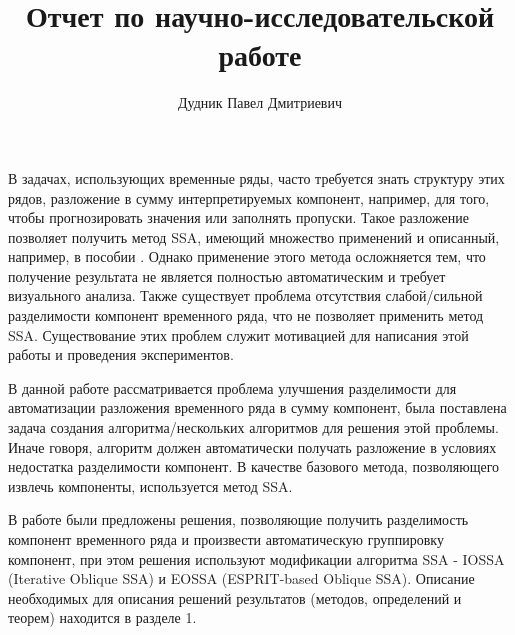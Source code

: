 \documentclass[specialist,
               substylefile = spbu_report.rtx,
               subf,href,colorlinks=true, 12pt]{disser}
\theoremstyle{definition}
\begin{document}
%
%

\title{Отчет по научно-исследовательской работе}


\author{Дудник Павел Дмитриевич}
    

\date{\number\year}

\maketitle

\tableofcontents

\intro
В задачах, использующих временные ряды, часто требуется знать структуру этих рядов, разложение в сумму интерпретируемых компонент, например, для того, чтобы прогнозировать значения или заполнять пропуски. Такое разложение позволяет получить метод SSA, имеющий множество применений и описанный, например, в пособии \cite{Golyandina04}. Однако применение этого метода осложняется тем, что получение результата не является полностью автоматическим и требует визуального анализа. Также существует проблема отсутствия слабой/сильной разделимости компонент временного ряда, что не позволяет применить метод SSA. Существование этих проблем служит мотивацией для написания этой работы и проведения экспериментов.

В данной работе рассматривается проблема улучшения разделимости для автоматизации разложения временного ряда в сумму компонент, была поставлена задача создания алгоритма/нескольких алгоритмов для решения этой проблемы. Иначе говоря, алгоритм должен автоматически получать разложение в условиях недостатка разделимости компонент. В качестве базового метода, позволяющего извлечь компоненты, используется метод SSA.

В работе были предложены решения, позволяющие получить разделимость компонент временного ряда и произвести автоматическую группировку компонент, при этом решения используют модификации алгоритма SSA - IOSSA (Iterative Oblique SSA) и EOSSA (ESPRIT-based Oblique SSA). Описание необходимых для описания решений результатов (методов, определений и теорем) находится в разделе 1.
\end{document}
